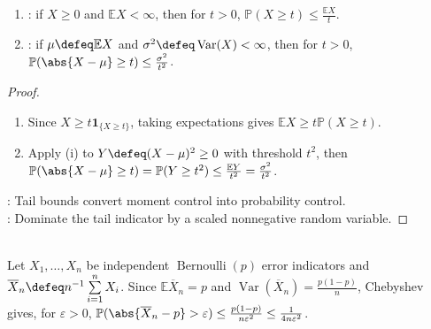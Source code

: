 \begin{theorem} \label{thm:markov-and-chebyshev-inequalities} 
\begin{enumerate}[label=\roman*.]
\setlength{\itemsep}{0pt}
\item {}: if $X\geq0$ and $\mathbb{E}X<\infty$, then for $t>0$, $\mathbb{P}(X\geq t)\leq\frac{\mathbb{E}X}{t}$.
\item {}: if $\mu\defeq\mathbb{E}X$ and $\sigma^2\defeq\operatorname{Var}(X)<\infty$, then for $t>0$, $\mathbb{P}(\abs{X-\mu}\geq t)\leq\frac{\sigma^2}{t^2}$.
\end{enumerate}
\begin{proof}
\begin{enumerate}[label=\roman*.]
\setlength{\itemsep}{0pt}
\item Since $X\geq t\mathbf{1}_{\{X\geq t\}}$, taking expectations gives $\mathbb{E}X\geq t\mathbb{P}(X\geq t)$.
\item Apply (i) to $Y\defeq(X-\mu)^2\geq0$ with threshold $t^2$, then $\mathbb{P}(\abs{X-\mu}\geq t)=\mathbb{P}(Y\geq t^2)\leq\frac{\mathbb{E}Y}{t^2}=\frac{\sigma^2}{t^2}$.
\end{enumerate}
: Tail bounds convert moment control into probability control.\\
: Dominate the tail indicator by a scaled nonnegative random variable.
\end{proof}
\end{theorem}

\begin{example} \label{ex:chebyshev-error-rate-bound} \\
Let $X_1,\ldots,X_n$ be independent $\operatorname{Bernoulli}(p)$ error indicators and $\overline{X}_n\defeq n^{-1}\sum\limits_{i=1}^{n}X_i$. Since $\mathbb{E}\overline{X}_n=p$ and $\operatorname{Var}(\overline{X}_n)=\frac{p(1-p)}{n}$, Chebyshev gives, for $\varepsilon>0$, $\mathbb{P}(\abs{\overline{X}_n-p}>\varepsilon)\leq\frac{p(1-p)}{n\varepsilon^2}\leq\frac{1}{4n\varepsilon^2}$.
\end{example}

